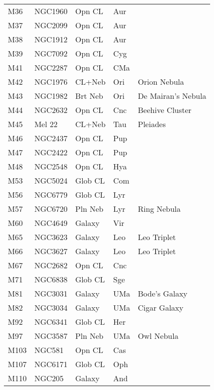 \begin{longtable}{ p{0.7in}  p{1.0in}  p{0.6in}  p{0.9in}  p{5.1in} }
M36 & NGC1960 & Opn CL & Aur &  \\ 
M37 & NGC2099 & Opn CL & Aur &  \\ 
M38 & NGC1912 & Opn CL & Aur &  \\ 
M39 & NGC7092 & Opn CL & Cyg &  \\ 
M41 & NGC2287 & Opn CL & CMa &  \\ 
M42 & NGC1976 & CL+Neb & Ori & Orion Nebula \\ 
M43 & NGC1982 & Brt Neb & Ori & De Mairan's Nebula \\ 
M44 & NGC2632 & Opn CL & Cnc & Beehive Cluster \\ 
M45 & Mel 22 & CL+Neb & Tau & Pleiades \\ 
M46 & NGC2437 & Opn CL & Pup &  \\ 
M47 & NGC2422 & Opn CL & Pup &  \\ 
M48 & NGC2548 & Opn CL & Hya &  \\ 
M53 & NGC5024 & Glob CL & Com &  \\ 
M56 & NGC6779 & Glob CL & Lyr &  \\ 
M57 & NGC6720 & Pln Neb & Lyr & Ring Nebula \\ 
M60 & NGC4649 & Galaxy & Vir &  \\ 
M65 & NGC3623 & Galaxy & Leo & Leo Triplet \\ 
M66 & NGC3627 & Galaxy & Leo & Leo Triplet \\ 
M67 & NGC2682 & Opn CL & Cnc &  \\ 
M71 & NGC6838 & Glob CL & Sge &  \\ 
M81 & NGC3031 & Galaxy & UMa & Bode's Galaxy \\ 
M82 & NGC3034 & Galaxy & UMa & Cigar Galaxy \\ 
M92 & NGC6341 & Glob CL & Her &  \\ 
M97 & NGC3587 & Pln Neb & UMa & Owl Nebula \\ 
M103 & NGC581 & Opn CL & Cas &  \\ 
M107 & NGC6171 & Glob CL & Oph &  \\ 
M110 & NGC205 & Galaxy & And &  \\ 
\hline 
\end{longtable} 

